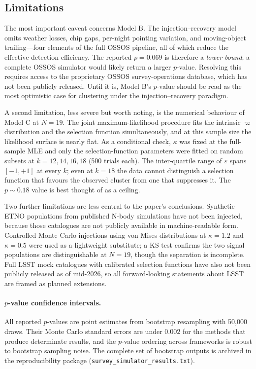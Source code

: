 \documentclass[usenatbib]{mnras}
\begin{document}
\subsection{Limitations}

The most important caveat concerns Model B. The injection--recovery model omits weather losses, chip gaps, per-night pointing variation, and moving-object trailing---four elements of the full OSSOS pipeline, all of which reduce the effective detection efficiency. The reported $p=0.069$ is therefore a \textit{lower bound}; a complete OSSOS simulator would likely return a larger $p$-value. Resolving this requires access to the proprietary OSSOS survey-operations database, which has not been publicly released. Until it is, Model B's $p$-value should be read as the most optimistic case for clustering under the injection--recovery paradigm.

A second limitation, less severe but worth noting, is the numerical behaviour of Model C at $N=19$. The joint maximum-likelihood procedure fits the intrinsic $\varpi$ distribution and the selection function simultaneously, and at this sample size the likelihood surface is nearly flat. As a conditional check, $\kappa$ was fixed at the full-sample MLE and only the selection-function parameters were fitted on random subsets at $k=12,14,16,18$ (500 trials each). The inter-quartile range of $\varepsilon$ spans $[-1,+1]$ at every $k$; even at $k=18$ the data cannot distinguish a selection function that favours the observed cluster from one that suppresses it. The $p\sim0.18$ value is best thought of as a ceiling.

Two further limitations are less central to the paper's conclusions. Synthetic ETNO populations from published N-body simulations have not been injected, because those catalogues are not publicly available in machine-readable form. Controlled Monte Carlo injections using von Mises distributions at $\kappa=1.2$ and $\kappa=0.5$ were used as a lightweight substitute; a KS test confirms the two signal populations are distinguishable at $N=19$, though the separation is incomplete. Full LSST mock catalogues with calibrated selection functions have also not been publicly released as of mid-2026, so all forward-looking statements about LSST are framed as planned extensions.

\paragraph{$p$-value confidence intervals.}
All reported $p$-values are point estimates from bootstrap resampling with 50,000 draws. Their Monte Carlo standard errors are under $0.002$ for the methods that produce determinate results, and the $p$-value ordering across frameworks is robust to bootstrap sampling noise. The complete set of bootstrap outputs is archived in the reproducibility package (\texttt{survey\_simulator\_results.txt}).
\end{document}
